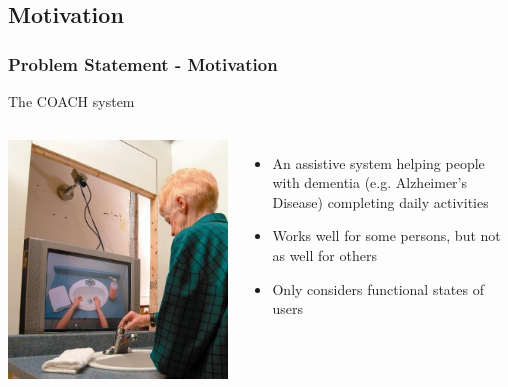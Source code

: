 \documentclass{beamer}
\begin{document}
\subsection{Motivation}
\begin{frame}
\frametitle{Problem Statement - Motivation}
The COACH system
\begin{columns}[c]
\includegraphics[width=\linewidth]{fig/testwash-flip.jpg}
\begin{itemize}
\item An assistive system helping people with dementia (e.g. Alzheimer's Disease) completing daily activities
\item Works well for some persons, but not as well for others
\item Only considers functional states of users
\end{itemize}
\end{columns}
\end{frame}

\end{document}
